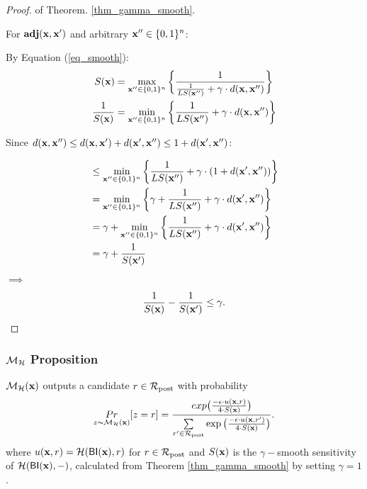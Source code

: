 \documentclass{article}
\begin{document}
\begin{proof}
of Theorem. \ref{thm_gamma_smooth}.

For $\textbf{adj}(\textbf{x},\textbf{x}')$ and arbitrary $\textbf{x}'' \in \{0,1\}^{n}$:

By Equation (\ref{eq_smooth}):
\begin{equation*}
\begin{split}
S(\textbf{x}) 
& = \max_{\textbf{x}'' \in \{0,1\}^{n}}\bigg \{ \frac{1}{\frac{1}{LS(\textbf{x}'')} +\gamma \cdot d(\textbf{x},\textbf{x}'')} \bigg \}\\
\frac{1}{S(\textbf{x})} 
& = \min_{\textbf{x}'' \in \{0,1\}^{n}}\bigg \{ \frac{1}{LS(\textbf{x}'')} +\gamma \cdot d(\textbf{x},\textbf{x}'') \bigg \}\\
\end{split}
\end{equation*}

Since $d(\textbf{x},\textbf{x}'') \leq d(\textbf{x},\textbf{x}') + d(\textbf{x}',\textbf{x}'') \leq 1 + d(\textbf{x}',\textbf{x}'')$:

\begin{equation*}
\begin{split}
& \leq \min_{\textbf{x}'' \in \{0,1\}^{n}}\bigg \{  \frac{1}{LS(\textbf{x}'')} +\gamma \cdot (1 + d(\textbf{x}',\textbf{x}'')) \bigg \}\\
& = \min_{\textbf{x}'' \in \{0,1\}^{n}}\bigg \{
\gamma + \frac{1}{LS(\textbf{x}'')} +\gamma \cdot d(\textbf{x}',\textbf{x}'')\bigg 
\}\\
& = \gamma + \min_{\textbf{x}'' \in \{0,1\}^{n}}\bigg \{
\frac{1}{LS(\textbf{x}'')} +\gamma \cdot d(\textbf{x}',\textbf{x}'')\bigg 
\}\\
& = \gamma + \frac{1}{S(\textbf{x}')}
\end{split}
\end{equation*}
$\implies$
\begin{equation*}
\frac{1}{S(\textbf{x})} - \frac{1}{S(\textbf{x}')} \leq \gamma.
\end{equation*}

\end{proof}

\subsubsection{$\mathcal{M}_{\mathcal{H}}$ Proposition}

\begin{definition}
\label{def_smoo_2}
$\mathcal{M}_{\mathcal{H}}(\textbf{x})$ outputs a candidate $r \in \mathcal{R}_{\textup{post}}$ with probability
\begin{equation*}
  \underset{z \thicksim \mathcal{M}_{\mathcal{H}}(\textbf{x})}{Pr}[z = r] = \frac {exp\big(\frac{-\epsilon\cdot u(\textbf{x}, {r})}{4\cdot S(\textbf{x})}\big)}
{\sum\limits_{r'\in \mathcal{R}_{\textup{post}}} \exp \big(\frac{-\epsilon\cdot u(\textbf{x}, r')}{4 \cdot S(\textbf{x})}\big)}.
\end{equation*}
where $u(\textbf{x}, {r}) = \mathcal{H}(\mathsf{BI}(\textbf{x}),r)$ for $r \in \mathcal{R}_{\textup{post}}$ and $S(\textbf{x})$ is the $\gamma -$smooth sensitivity of $\mathcal{H}(\mathsf{BI}(\textbf{x}),-)$, calculated from Theorem \ref{thm_gamma_smooth} by setting $\gamma = 1$.
\end{definition}
\end{document}
